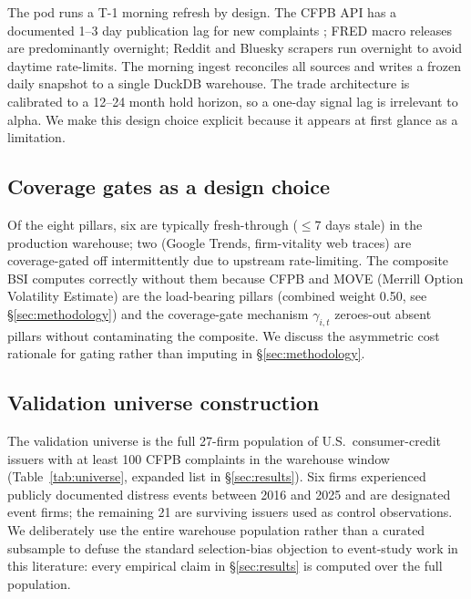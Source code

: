 \documentclass[11pt,a4paper]{article}
\begin{document}
The pod runs a T-1 morning refresh by design. The CFPB API has a documented 1--3 day publication lag for new complaints \citep{cfpb2023api}; FRED macro releases are predominantly overnight; Reddit and Bluesky scrapers run overnight to avoid daytime rate-limits. The morning ingest reconciles all sources and writes a frozen daily snapshot to a single DuckDB warehouse. The trade architecture is calibrated to a 12--24 month hold horizon, so a one-day signal lag is irrelevant to alpha. We make this design choice explicit because it appears at first glance as a limitation.

\subsection{Coverage gates as a design choice}

Of the eight pillars, six are typically fresh-through ($\le 7$ days stale) in the production warehouse; two (Google Trends, firm-vitality web traces) are coverage-gated off intermittently due to upstream rate-limiting. The composite BSI computes correctly without them because CFPB and MOVE (Merrill Option Volatility Estimate) are the load-bearing pillars (combined weight 0.50, see §\ref{sec:methodology}) and the coverage-gate mechanism $\gamma_{i,t}$ zeroes-out absent pillars without contaminating the composite. We discuss the asymmetric cost rationale for gating rather than imputing in §\ref{sec:methodology}.

\subsection{Validation universe construction}

The validation universe is the full 27-firm population of U.S.\ consumer-credit issuers with at least 100 CFPB complaints in the warehouse window (Table~\ref{tab:universe}, expanded list in §\ref{sec:results}). Six firms experienced publicly documented distress events between 2016 and 2025 and are designated event firms; the remaining 21 are surviving issuers used as control observations. We deliberately use the entire warehouse population rather than a curated subsample to defuse the standard selection-bias objection to event-study work in this literature: every empirical claim in §\ref{sec:results} is computed over the full population.
\end{document}
